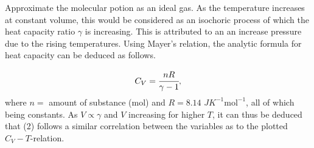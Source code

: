\documentclass[12pt]{article}
\begin{document}
\noindent Approximate the molecular potion as an ideal gas. As the temperature increases at constant volume, this would be considered as an isochoric process of which the heat capacity ratio $\gamma$ is increasing. This is attributed to an an increase pressure due to the rising temperatures. Using Mayer's relation, the analytic formula for heat capacity can be deduced as follows.

\begin{equation}
C_V = \cfrac{nR}{\gamma -1},
\end{equation}
where $n = $  amount of substance (mol) and $R = 8.14$ $JK^{-1}\text{mol}^{-1}$, all of which being constants.
\newline 
As $V \propto \gamma$ and $V$ increasing for higher $T$, it can thus be deduced that (2) follows a similar correlation between the variables as to the plotted $C_V - T$-relation.
\end{document}
